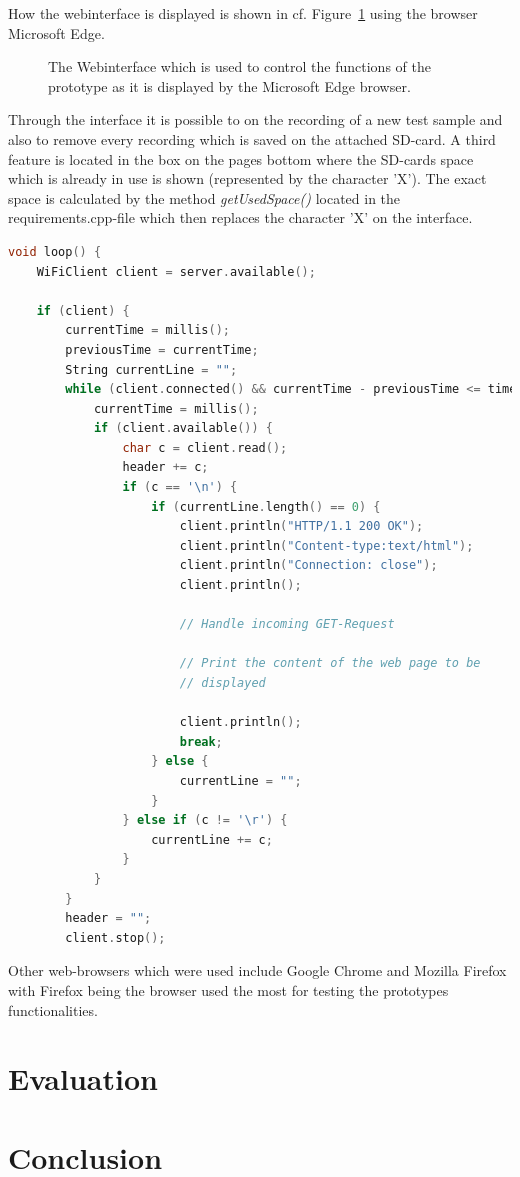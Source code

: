 How the webinterface is displayed is shown in cf. Figure~\ref{fig:webinterface} using the browser Microsoft Edge.
\begin{figure}
	\caption{The Webinterface which is used to control the functions of the prototype as it is displayed by the Microsoft Edge browser.}
	\label{fig:webinterface}
\end{figure}
Through the interface it is possible to on the recording of a new test sample and also to remove every recording which is saved on the attached SD-card.
A third feature is located in the box on the pages bottom where the SD-cards space which is already in use is shown (represented by the character 'X').
The exact space is calculated by the method \textit{getUsedSpace()} located in the requirements.cpp-file which then replaces the character 'X' on the interface. 
\begin{lstlisting}[frame=single, language={c++}, style=style,
	caption={TBD sadfasfvereqadsfasfadsvasdfwFSADGASGDFASDFG.}, label={lst:WiFiCon},float=!htb]
void loop() {
	WiFiClient client = server.available();
	
	if (client) {
		currentTime = millis();
		previousTime = currentTime;
		String currentLine = "";
		while (client.connected() && currentTime - previousTime <= timeoutTime) {
			currentTime = millis();
			if (client.available()) {
				char c = client.read();
				header += c;
				if (c == '\n') {
					if (currentLine.length() == 0) {
						client.println("HTTP/1.1 200 OK");
						client.println("Content-type:text/html");
						client.println("Connection: close");
						client.println();
						
						// Handle incoming GET-Request
						
						// Print the content of the web page to be
						// displayed
						
						client.println();
						break;
					} else {
						currentLine = "";
					}
				} else if (c != '\r') {
					currentLine += c;
				}
			}
		}
		header = "";
		client.stop();
\end{lstlisting}

Other web-browsers which were used include Google Chrome and Mozilla Firefox with Firefox being the browser used the most for testing the prototypes functionalities.

\section{Evaluation}
\section{Conclusion}
